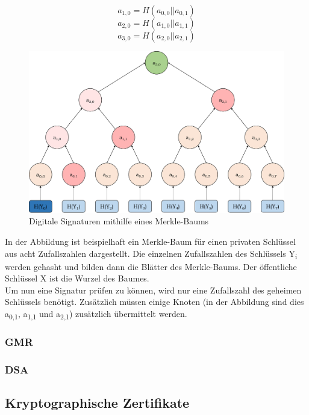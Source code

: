 			\[ a_{1,0} = H(a_{0,0}||a_{0,1}) \]
			\[ a_{2,0} = H(a_{1,0}||a_{1,1}) \]
			\[ a_{3,0} = H(a_{2,0}||a_{2,1}) \]
			
			\begin{figure}[htbp]
				\centering
				\includegraphics[width=\textwidth]{chapters/abb/grundlagen-merkle}
				\caption{Digitale Signaturen mithilfe eines Merkle-Baums}
				\label{fig:grundlagen:merkle}
			\end{figure}
		
			In der Abbildung ist beispielhaft ein Merkle-Baum für einen privaten Schlüssel aus acht Zufallszahlen dargestellt. Die einzelnen Zufallszahlen des Schlüssels Y\textsubscript{i} werden gehasht und bilden dann die Blätter des Merkle-Baums. Der öffentliche Schlüssel X ist die Wurzel des Baumes.\\
		
			Um nun eine Signatur prüfen zu können, wird nur eine Zufallszahl des geheimen Schlüssels benötigt. Zusätzlich müssen einige Knoten (in der Abbildung sind dies a\textsubscript{0,1}, a\textsubscript{1,1} und a\textsubscript{2,1}) zusätzlich übermittelt werden.
			
			
			
			\subsubsection{GMR}
			\label{subsubsec:grundlagen:krypto:auth:gmr}
			
			\subsubsection{DSA}
			\label{subsubsec:grundlagen:krypto:auth:dsa}
			
		\subsection{Kryptographische Zertifikate}
		\label{subsec:grundlagen:krypto:cert}
		
